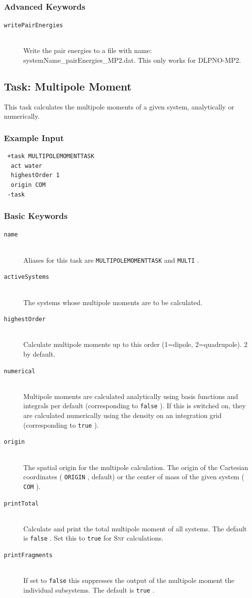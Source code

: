 \documentclass[bibliography=totocnumbered,a4paper,10pt,oneside]{scrbook}
\newcommand{\ttt}[1]{%
  \begingroup\setlength{\fboxsep}{1pt}%
  \colorbox{serenity-green!30}{\texttt{\hspace*{2pt}\vphantom{(g}#1\hspace*{2pt}}}%
  \endgroup
}
\begin{document}
\subsubsection{Advanced Keywords}
\begin{description}
  \item [\texttt{writePairEnergies}]\hfill \\
  Write the pair energies to a file with name: systemName\_pairEnergies\_MP2.dat.
  This only works for DLPNO-MP2.
\end{description}

\subsection{Task: Multipole Moment}
This task calculates the multipole moments of a given system, analytically or numerically.
\subsubsection{Example Input}
\begin{lstlisting}
 +task MULTIPOLEMOMENTTASK
  act water
  highestOrder 1
  origin COM
 -task
\end{lstlisting}

\subsubsection{Basic Keywords}
\begin{description}
\item [\texttt{name}]\hfill \\
  Aliases for this task are \ttt{MULTIPOLEMOMENTTASK} and \ttt{MULTI}.
\item [\texttt{activeSystems}]\hfill \\
  The systems whose multipole moments are to be calculated.
\item [\texttt{highestOrder}]\hfill \\
Calculate multipole moments up to this order (1=dipole, 2=quadrupole). 2 by default.
\item [\texttt{numerical}]\hfill \\
Multipole moments are calculated analytically using basis functions
and integrals per default (corresponding to \ttt{false}). If this is switched on,
they are calculated numerically using the density on an integration grid (corresponding to \ttt{true}).
\item [\texttt{origin}]\hfill \\
The spatial origin for the multipole calculation.
The origin of the Cartesian coordinates (\ttt{ORIGIN}, default) or the center
of mass of the given system (\ttt{COM}).
\item [\texttt{printTotal}]\hfill \\
Calculate and print the total multipole moment of all systems. The default is \ttt{false}.
Set this to \ttt{true} for \textsc{Snf} calculations.
\item [\texttt{printFragments}]\hfill \\
If set to \ttt{false} this suppresses the output of the multipole moment the individual subsystems.
The default is \ttt{true}.
\end{description}
\end{document}
